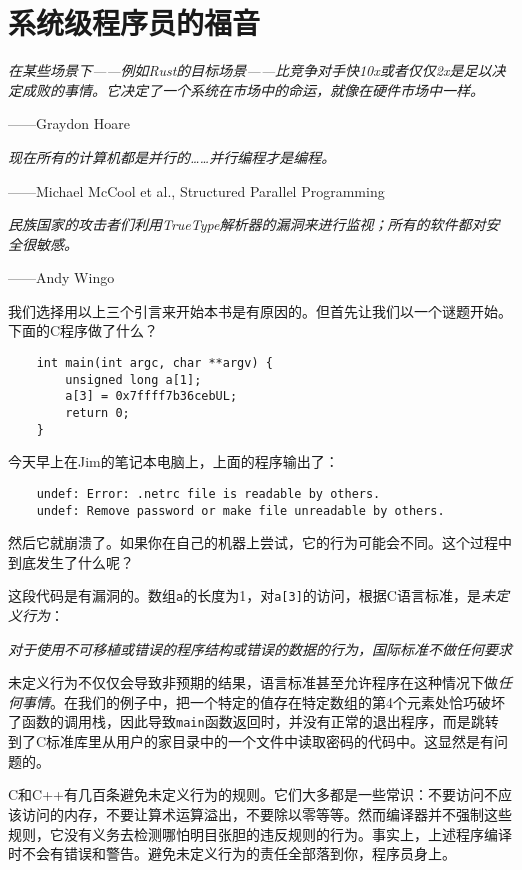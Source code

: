 \chapter{系统级程序员的福音}\label{ch01}
\emph{在某些场景下——例如Rust的目标场景——比竞争对手快10x或者仅仅2x是足以决定成败的事情。它决定了一个系统在市场中的命运，就像在硬件市场中一样。}
\begin{flushright}
    ——Graydon Hoare
\end{flushright}

\emph{现在所有的计算机都是并行的……并行编程才是编程。}
\begin{flushright}
    ——Michael McCool et al., Structured Parallel Programming    
\end{flushright}

\emph{民族国家的攻击者们利用TrueType解析器的漏洞来进行监视；所有的软件都对安全很敏感。}
\begin{flushright}
    ——Andy Wingo
\end{flushright}

我们选择用以上三个引言来开始本书是有原因的。但首先让我们以一个谜题开始。下面的C程序做了什么？
\begin{verbatim}
    int main(int argc, char **argv) {
        unsigned long a[1];
        a[3] = 0x7ffff7b36cebUL;
        return 0;
    }
\end{verbatim}

今天早上在Jim的笔记本电脑上，上面的程序输出了：
\begin{verbatim}
    undef: Error: .netrc file is readable by others.
    undef: Remove password or make file unreadable by others.
\end{verbatim}
然后它就崩溃了。如果你在自己的机器上尝试，它的行为可能会不同。这个过程中到底发生了什么呢？

这段代码是有漏洞的。数组\texttt{a}的长度为1，对\texttt{a[3]}的访问，根据C语言标准，是\emph{未定义行为}：

\emph{对于使用不可移植或错误的程序结构或错误的数据的行为，国际标准不做任何要求}

未定义行为不仅仅会导致非预期的结果，语言标准甚至允许程序在这种情况下做\emph{任何事情}。在我们的例子中，把一个特定的值存在特定数组的第4个元素处恰巧破坏了函数的调用栈，因此导致\texttt{main}函数返回时，并没有正常的退出程序，而是跳转到了C标准库里从用户的家目录中的一个文件中读取密码的代码中。这显然是有问题的。

C和C++有几百条避免未定义行为的规则。它们大多都是一些常识：不要访问不应该访问的内存，不要让算术运算溢出，不要除以零等等。然而编译器并不强制这些规则，它没有义务去检测哪怕明目张胆的违反规则的行为。事实上，上述程序编译时不会有错误和警告。避免未定义行为的责任全部落到你，程序员身上。

